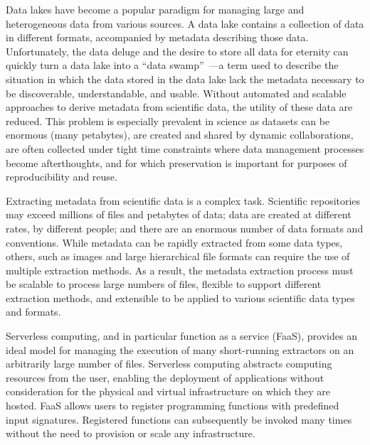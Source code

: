 \documentclass[sigconf]{acmart}
\begin{document}
Data lakes have become a popular paradigm for managing large and 
heterogeneous data from various sources. 
A data lake contains a collection of data in different formats, 
accompanied by metadata describing those data. %
Unfortunately, the data deluge and the desire to store all data
for eternity can quickly turn a data lake into a ``data 
swamp''~\cite{skluzacek2018skluma}---a term used to describe the situation in which the data 
stored in the data lake lack the metadata necessary to be 
discoverable, understandable, and usable. Without automated and scalable 
approaches to derive metadata from scientific data, the utility of 
these data are reduced. This problem is 
especially prevalent in science as 
datasets can be enormous (many petabytes),
are created and shared by dynamic collaborations, 
are often collected under tight time constraints where data management processes become afterthoughts, 
and for which preservation is important for purposes of reproducibility and reuse. 

Extracting metadata from scientific data is a complex task. 
Scientific repositories may exceed millions of files and petabytes of data;
data are created at different rates, by different people; 
and there are an enormous number of data formats and conventions. 
While metadata can be rapidly extracted from some data types, others, such as
images and large hierarchical file formats can require the use of multiple extraction methods.  
As a result, the metadata extraction process must be scalable to process large numbers
of files, flexible to support different extraction methods, and extensible
to be applied to various scientific data types and formats.

Serverless computing, and in particular function as a service (FaaS),
provides an ideal model for managing the execution of
many short-running extractors on an arbitrarily large number of files. 
Serverless computing abstracts computing resources from the user, enabling
the deployment of applications without consideration for the physical and virtual infrastructure on which 
they are hosted. %
FaaS allows users to register programming functions with predefined input signatures. 
Registered functions can subsequently be invoked many times
without the need to provision or scale any infrastructure.
\end{document}
